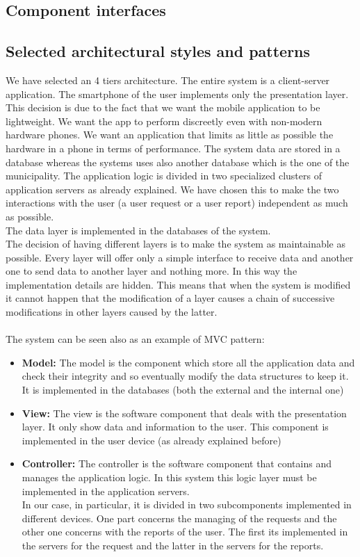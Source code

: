 \documentclass[titlepage]{article}
\begin{document}
\subsection{Component interfaces}
\subsection{Selected architectural styles and patterns}
We have selected an 4 tiers architecture. The entire system is a client-server application. The smartphone of the user implements only the presentation layer. This decision is due to the fact that we want the mobile application to be lightweight. We want the app to perform discreetly even with non-modern hardware phones. We want an application that limits as little as possible the hardware in a phone in terms of performance. The system data are stored in a database  whereas the systems uses also another database which is the one of the municipality.
The application logic is divided in two specialized clusters of application servers as already explained. We have chosen this to make the two interactions with the user (a user request or a user report) independent as much as possible.\\
 The data layer is implemented in the databases of the system.\\
The decision of having different layers is to make the system as maintainable as possible. Every layer will offer only a simple interface to receive data and another one to send data to another layer and nothing more. In this way the implementation details are hidden. This means that when the system is modified it cannot happen that the modification of a layer causes a chain of successive modifications in other layers caused by the latter.\\ \\
The system can be seen also as an example of MVC pattern:
\begin{itemize}
	 \item \textbf{Model:} The model is the component which store all the application data and check their integrity and so eventually modify the data structures to keep it. It is implemented in the databases (both the external and the internal one)
	 \item \textbf{View:} The view is the software component that deals with the presentation layer. It only show data and information to the user. This component is implemented in the user device (as already explained before)
	 \item \textbf{Controller:} The controller is the software component that contains and manages the application logic. In this system this logic layer must be implemented in the application servers. \\
In our case, in particular, it is divided in two subcomponents implemented in different devices. One part concerns the managing of the requests and the other one concerns with the reports of the user. The first its implemented in the servers for the request and the latter in the servers for the reports.
\end{itemize}
\end{document}
